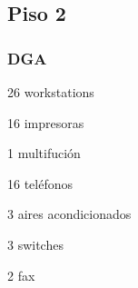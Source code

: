 \documentclass[a4paper,11pt,oneside]{article}
\begin{document}
\subsection*{Piso 2}
%
\subsubsection*{DGA}
\begin{itemize*}
\item 26 workstations
\item 16 impresoras
\item 1 multifución
\item 16 teléfonos
\item 3 aires acondicionados
\item 3 switches
\item 2 fax
\end{itemize*}
%
\end{document}
